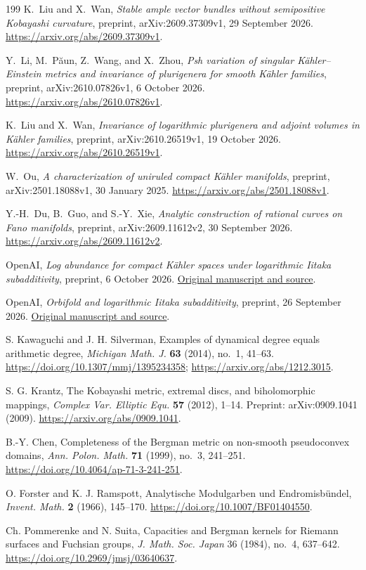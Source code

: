 \documentclass[11pt,reqno]{amsart}
\theoremstyle{definition}
\theoremstyle{remark}
\begin{document}
\begin{thebibliography}{199}
 K.~Liu and X.~Wan, \emph{Stable ample vector bundles without semipositive Kobayashi curvature}, preprint, arXiv:2609.37309v1, 29 September 2026. \url{https://arxiv.org/abs/2609.37309v1}.

 Y.~Li, M.~P\u aun, Z.~Wang, and X.~Zhou, \emph{Psh variation of singular K\"ahler--Einstein metrics and invariance of plurigenera for smooth K\"ahler families}, preprint, arXiv:2610.07826v1, 6 October 2026. \url{https://arxiv.org/abs/2610.07826v1}.

 K.~Liu and X.~Wan, \emph{Invariance of logarithmic plurigenera and adjoint volumes in K\"ahler families}, preprint, arXiv:2610.26519v1, 19 October 2026. \url{https://arxiv.org/abs/2610.26519v1}.

 W.~Ou, \emph{A characterization of uniruled compact K\"ahler manifolds}, preprint, arXiv:2501.18088v1, 30 January 2025. \url{https://arxiv.org/abs/2501.18088v1}.

 Y.-H.~Du, B.~Guo, and S.-Y.~Xie, \emph{Analytic construction of rational curves on Fano manifolds}, preprint, arXiv:2609.11612v2, 30 September 2026. \url{https://arxiv.org/abs/2609.11612v2}.

 OpenAI, \emph{Log abundance for compact K\"ahler spaces under logarithmic Iitaka subadditivity}, preprint, 6 October 2026. \href{https://github.com/openai/math/tree/main/preprints/Log-abundance-for-compact-Kahler-spaces-under-logarithmic-Iitaka-subadditivity-October-6-2026}{Original manuscript and source}.

 OpenAI, \emph{Orbifold and logarithmic Iitaka subadditivity}, preprint, 26 September 2026. \href{https://github.com/openai/math/tree/main/preprints/Orbifold-and-logarithmic-Iitaka-subadditivity-September-26-2026}{Original manuscript and source}.

 S. Kawaguchi and J. H. Silverman, Examples of dynamical degree equals arithmetic degree, \emph{Michigan Math. J.} \textbf{63} (2014), no.~1, 41--63. \url{https://doi.org/10.1307/mmj/1395234358}; \url{https://arxiv.org/abs/1212.3015}.

 S. G. Krantz, The Kobayashi metric, extremal discs, and biholomorphic mappings, \emph{Complex Var. Elliptic Equ.} \textbf{57} (2012), 1--14. Preprint: arXiv:0909.1041 (2009). \url{https://arxiv.org/abs/0909.1041}.

 B.-Y. Chen, Completeness of the Bergman metric on non-smooth pseudoconvex domains, \emph{Ann. Polon. Math.} \textbf{71} (1999), no.~3, 241--251. \url{https://doi.org/10.4064/ap-71-3-241-251}.

 O. Forster and K. J. Ramspott, Analytische Modulgarben und Endromisb\"undel, \emph{Invent. Math.} \textbf{2} (1966), 145--170. \url{https://doi.org/10.1007/BF01404550}.

 Ch. Pommerenke and N. Suita, Capacities and Bergman kernels for Riemann surfaces and Fuchsian groups, \emph{J. Math. Soc. Japan} 36 (1984), no.~4, 637--642. \url{https://doi.org/10.2969/jmsj/03640637}.

\end{thebibliography}
\end{document}
